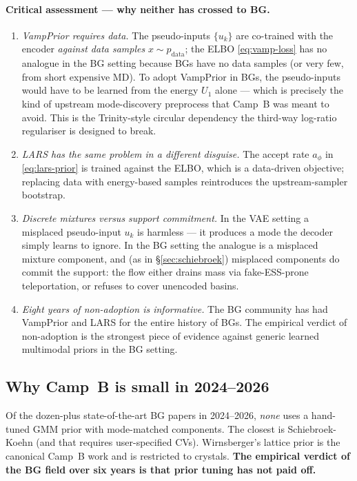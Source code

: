 \documentclass[11pt,letterpaper]{article}
\theoremstyle{plain}
\begin{document}
\paragraph{Critical assessment --- why neither has crossed to BG.}
\begin{enumerate}[leftmargin=1.6em,itemsep=2pt,topsep=2pt]
  \item \emph{VampPrior requires data.} The pseudo-inputs $\{u_k\}$ are
    co-trained with the encoder \emph{against data samples}
    $x\sim p_{\mathrm{data}}$; the ELBO \eqref{eq:vamp-loss} has no
    analogue in the BG setting because BGs have no data samples (or very
    few, from short expensive MD). To adopt VampPrior in BGs, the
    pseudo-inputs would have to be learned from the energy $U_1$ alone
    --- which is precisely the kind of upstream mode-discovery preprocess
    that Camp~B was meant to avoid. This is the Trinity-style circular
    dependency the third-way log-ratio regulariser is designed to break.
  \item \emph{LARS has the same problem in a different disguise.} The
    accept rate $a_\phi$ in \eqref{eq:lars-prior} is trained against the
    ELBO, which is a data-driven objective; replacing data with
    energy-based samples reintroduces the upstream-sampler bootstrap.
  \item \emph{Discrete mixtures versus support commitment.} In the VAE
    setting a misplaced pseudo-input $u_k$ is harmless --- it produces a
    mode the decoder simply learns to ignore. In the BG setting the
    analogue is a misplaced mixture component, and (as in
    \S\ref{sec:schiebroek}) misplaced components do commit the support:
    the flow either drains mass via fake-ESS-prone teleportation, or
    refuses to cover unencoded basins.
  \item \emph{Eight years of non-adoption is informative.} The BG
    community has had VampPrior and LARS for the entire history of BGs.
    The empirical verdict of non-adoption is the strongest piece of
    evidence against generic learned multimodal priors in the BG
    setting.
\end{enumerate}

\subsection{Why Camp~B is small in 2024--2026}

Of the dozen-plus state-of-the-art BG papers in 2024--2026, \emph{none} uses a
hand-tuned GMM prior with mode-matched components. The closest is
Schiebroek-Koehn (and that requires user-specified CVs). Wirnsberger's lattice
prior is the canonical Camp~B work and is restricted to crystals.
\textbf{The empirical verdict of the BG field over six years is that prior tuning
has not paid off.}
\end{document}

